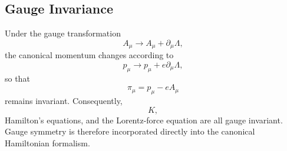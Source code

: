 \subsection{Gauge Invariance}
Under the gauge transformation
\[A_\mu\rightarrow A_\mu+\partial_\mu\Lambda,\]
the canonical momentum changes according to
\[p_\mu\rightarrow p_\mu+e\partial_\mu\Lambda,\]
so that
\[\boxed{\pi_\mu=p_\mu-eA_\mu}\]
remains invariant.
Consequently,
\[K,\]
Hamilton's equations,
and the Lorentz-force equation are all gauge invariant.
Gauge symmetry is therefore incorporated directly into the canonical
Hamiltonian formalism.
